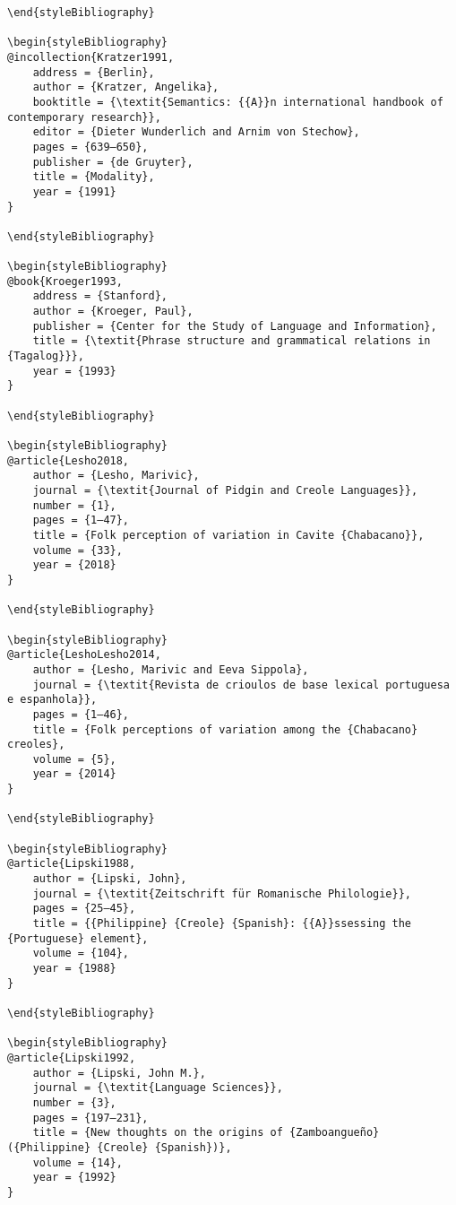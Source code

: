 \documentclass[output=paper]{langsci/langscibook}
\begin{document}
\begin{stylelsUnNumberedSection}
\begin{verbatim}
\end{styleBibliography}

\begin{styleBibliography}
@incollection{Kratzer1991,
	address = {Berlin},
	author = {Kratzer, Angelika},
	booktitle = {\textit{Semantics: {{A}}n international handbook of contemporary research}},
	editor = {Dieter Wunderlich and Arnim von Stechow},
	pages = {639–650},
	publisher = {de Gruyter},
	title = {Modality},
	year = {1991}
}

\end{styleBibliography}

\begin{styleBibliography}
@book{Kroeger1993,
	address = {Stanford},
	author = {Kroeger, Paul},
	publisher = {Center for the Study of Language and Information},
	title = {\textit{Phrase structure and grammatical relations in {Tagalog}}},
	year = {1993}
}

\end{styleBibliography}

\begin{styleBibliography}
@article{Lesho2018,
	author = {Lesho, Marivic},
	journal = {\textit{Journal of Pidgin and Creole Languages}},
	number = {1},
	pages = {1–47},
	title = {Folk perception of variation in Cavite {Chabacano}},
	volume = {33},
	year = {2018}
}

\end{styleBibliography}

\begin{styleBibliography}
@article{LeshoLesho2014,
	author = {Lesho, Marivic and Eeva Sippola},
	journal = {\textit{Revista de crioulos de base lexical portuguesa e espanhola}},
	pages = {1–46},
	title = {Folk perceptions of variation among the {Chabacano} creoles},
	volume = {5},
	year = {2014}
}

\end{styleBibliography}

\begin{styleBibliography}
@article{Lipski1988,
	author = {Lipski, John},
	journal = {\textit{Zeitschrift für Romanische Philologie}},
	pages = {25–45},
	title = {{Philippine} {Creole} {Spanish}: {{A}}ssessing the {Portuguese} element},
	volume = {104},
	year = {1988}
}

\end{styleBibliography}

\begin{styleBibliography}
@article{Lipski1992,
	author = {Lipski, John M.},
	journal = {\textit{Language Sciences}},
	number = {3},
	pages = {197–231},
	title = {New thoughts on the origins of {Zamboangueño} ({Philippine} {Creole} {Spanish})},
	volume = {14},
	year = {1992}
}


\end{verbatim}
\end{stylelsUnNumberedSection}
\end{document}
